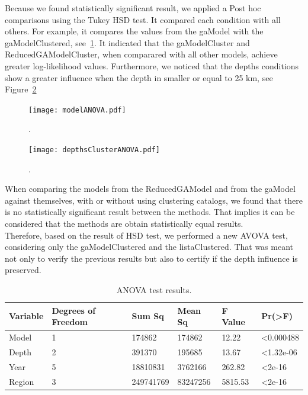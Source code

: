 Because we found statistically significant result, we applied a Post hoc comparisons using the Tukey HSD test. It compared each condition with all others. For example, it compares the values from the gaModel with the gaModelClustered, see~\ref{modelANOVA}. It indicated that the gaModelCluster and ReducedGAModelCluster, when comparared with all other models, achieve greater log-likelihood values. Furthermore, we noticed that the depths conditions show a greater influence when the depth in smaller or equal to 25 km, see Figure~\ref{depthsANOVA}\\

\begin{figure}[H]
	\centering
	\texttt{[image: modelANOVA.pdf]}
	\caption{.}
	\label{modelANOVA}
\end{figure}

\begin{figure}[H]
	\centering
	\texttt{[image: depthsClusterANOVA.pdf]}
	\caption{.}
	\label{depthsANOVA}
\end{figure}

When comparing the models from the ReducedGAModel and from the gaModel against themselves, with or without using clustering catalogs, we found that there is no statistically significant result between the methods. That implies it can be considered that the methods are obtain statistically equal results.\\

Therefore, based on the result of HSD test, we performed a new AVOVA test, considering only the gaModelClustered and the listaClustered. That was meant not only to verify the previous results but also to certify if the depth influence is preserved.\\

\begin{table}[!ht]
	\centering
	\begin{tabular}{|l|l|l|l|l|l|}
		\hline
		{Variable} & {Degrees of Freedom} & {Sum Sq}    & {Mean Sq}   & {F Value} & {Pr(\textgreater F)} \\
		\hline
		Model    & 1           & 174862   & 174862   & 12.22   & \textless0.000488     \\
		\hline
		
		Depth    & 2                  & 391370  & 195685   & 13.67   & \textless1.32e-06     \\
		\hline
		Year     & 5                  & 18810831  & 3762166  & 262.82   & \textless2e-16     \\
		\hline
		Region   & 3                  & 249741769 & 83247256 & 5815.53 & \textless2e-16\\    
		\hline
	\end{tabular}
	\caption{ANOVA test results.}
	\label{anovatest}
\end{table}


